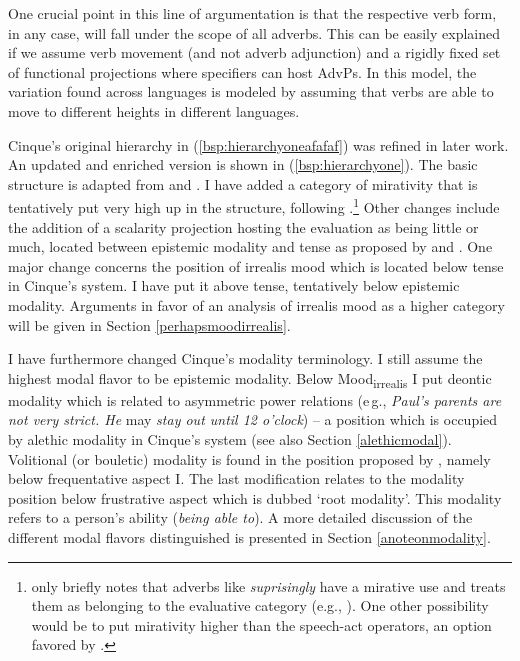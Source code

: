 \noindent One crucial point in this line of argumentation is that the respective verb form, in any case, will fall under the scope of all adverbs. This can be easily explained if we assume verb movement (and not adverb adjunction) and a rigidly fixed set of functional projections where specifiers can host AdvPs. In this model, the variation found across languages is modeled by assuming that verbs are able to move to different heights in different languages. 

Cinque's original hierarchy in (\ref{bsp:hierarchyoneafafaf}) was refined in later work. An updated and enriched version is shown in (\ref{bsp:hierarchyone}). The basic structure is adapted from \citet{cinque1999adverbs} and \citet{cinque2006restructuring}. I have added a category of mirativity that is tentatively put very high up in the structure,\label{mirmir} following \citet[317]{testcari2013}.\footnote{ \citet[183]{cinque2006restructuring} only briefly notes that adverbs like \textit{suprisingly} have a mirative use and treats them as belonging to the evaluative category (e.g., \citealt[201]{cinque1999adverbs}). One other possibility would be to put mirativity higher than the speech-act operators, an option favored by \citet[57--59]{varley2014evidentiality}.} Other changes include the addition of a scalarity projection hosting the evaluation as being little or much, located between epistemic modality and tense as proposed by \citet{hole2015distributed} and \citet{bross2017scope}. One major change concerns the position of irrealis mood which is located below tense in Cinque's system. I have put it above tense, tentatively below epistemic modality. Arguments in favor of an analysis of irrealis mood as a higher category will be given in Section \ref{perhapsmoodirrealis}.

I have furthermore changed Cinque's modality terminology. I still assume the highest modal flavor to be epistemic modality. Below Mood\textsubscript{irrealis} I put deontic modality which is related to asymmetric power relations (e\,g., \textit{Paul's parents are not very strict. He} may \textit{stay out until 12 o'clock}) -- a position which is occupied by alethic modality in Cinque's system (see also Section \ref{alethicmodal}). Volitional (or bouletic) modality is found in the position proposed by \citet{cinque1999adverbs}, namely below frequentative aspect I. The last modification relates to the modality position below frustrative aspect which is dubbed `root modality'. This modality refers to a person's ability (\textit{being able to}). A more detailed discussion of the different modal flavors distinguished is presented in Section \ref{anoteonmodality}.

